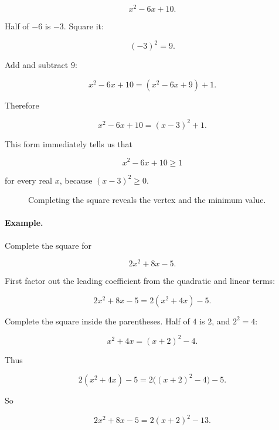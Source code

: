 \[
x^2-6x+10.
\]

Half of \(-6\) is \(-3\).  Square it:

\[
(-3)^2=9.
\]

Add and subtract \(9\):

\[
x^2-6x+10
=
(x^2-6x+9)+1.
\]

Therefore

\[
\boxed{
x^2-6x+10=(x-3)^2+1.
}
\]

This form immediately tells us that

\[
x^2-6x+10\ge1
\]

for every real \(x\), because \((x-3)^2\ge0\).

\begin{figure}[h]
\centering
{}
\caption{Completing the square reveals the vertex and the minimum value.}
\label{fig:completing-square-vertex}
\end{figure}

\paragraph{Example.}
Complete the square for

\[
2x^2+8x-5.
\]

First factor out the leading coefficient from the quadratic and linear terms:

\[
2x^2+8x-5=2(x^2+4x)-5.
\]

Complete the square inside the parentheses.  Half of \(4\) is \(2\), and \(2^2=4\):

\[
x^2+4x=(x+2)^2-4.
\]

Thus

\[
2(x^2+4x)-5
=
2\bigl((x+2)^2-4\bigr)-5.
\]

So

\[
\boxed{
2x^2+8x-5=2(x+2)^2-13.
}
\]

